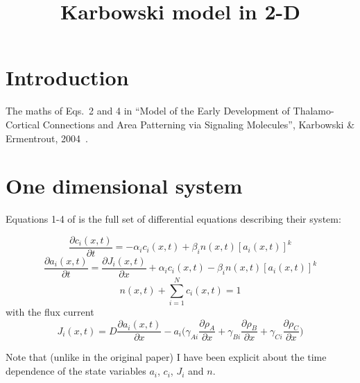 \documentclass[11pt, a4paper]{article}
\title {
  Karbowski model in 2-D
}
\date{} %
\author{\Authors}
\begin{document}
\setlength{\droptitle}{-1.8cm} %
\maketitle

\vspace{-1.8cm} %

\section{Introduction}

The maths of Eqs.~2 and 4 in ``Model of the Early Development of
Thalamo-Cortical Connections and Area Patterning via Signaling
Molecules'', Karbowski \& Ermentrout, 2004~\cite{karbowski_model_2004}.

\section{One dimensional system}

Equations 1-4 of \cite{karbowski_model_2004} is the full set of
differential equations describing their system:

\begin{equation}
\frac{\partial c_i(x, t)}{\partial t} = -\alpha_i c_i(x, t) + \beta_i
n(x, t)[a_i(x, t)]^k
\end{equation}
%
\begin{equation}
\frac{\partial a_i(x, t)}{\partial t} = \frac{\partial J_i(x, t)}{\partial
x} + \alpha_i c_i(x, t) - \beta_i n(x, t)[a_i(x, t)]^k
\end{equation}
%
\begin{equation}
n(x, t) + \sum_{i=1}^{N} c_i(x, t) = 1
\end{equation}
%
with the flux current
%
\begin{equation}
J_i(x, t) = D \frac{\partial a_i(x, t)}{\partial x} - a_i
\bigg(\gamma_{Ai} \frac{\partial \rho_A}{\partial x} +\gamma_{Bi} \frac{\partial \rho_B}{\partial x} + \gamma_{Ci} \frac{\partial \rho_C}{\partial x} \bigg)
\end{equation}

Note that (unlike in the original paper) I have been explicit about
the time dependence of the state variables $a_i$, $c_i$, $J_i$ and $n$.
\end{document}
